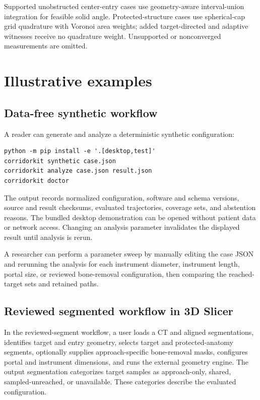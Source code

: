 \documentclass[preprint,12pt]{elsarticle}
\begin{document}
Supported unobstructed center-entry cases use geometry-aware interval-union integration for feasible solid angle. Protected-structure cases use spherical-cap grid quadrature with Voronoi area weights; added target-directed and adaptive witnesses receive no quadrature weight. Unsupported or nonconverged measurements are omitted.

\section{Illustrative examples}

\subsection{Data-free synthetic workflow}

A reader can generate and analyze a deterministic synthetic configuration:

\begin{verbatim}
python -m pip install -e '.[desktop,test]'
corridorkit synthetic case.json
corridorkit analyze case.json result.json
corridorkit doctor
\end{verbatim}

The output records normalized configuration, software and schema versions, source and result checksums, evaluated trajectories, coverage sets, and abstention reasons. The bundled desktop demonstration can be opened without patient data or network access. Changing an analysis parameter invalidates the displayed result until analysis is rerun.

A researcher can perform a parameter sweep by manually editing the case JSON and rerunning the analysis for each instrument diameter, instrument length, portal size, or reviewed bone-removal configuration, then comparing the reached-target sets and retained paths.

\subsection{Reviewed segmented workflow in 3D Slicer}

In the reviewed-segment workflow, a user loads a CT and aligned segmentations, identifies target and entry geometry, selects target and protected-anatomy segments, optionally supplies approach-specific bone-removal masks, configures portal and instrument dimensions, and runs the external geometry engine. The output segmentation categorizes target samples as approach-only, shared, sampled-unreached, or unavailable. These categories describe the evaluated configuration.
\end{document}
